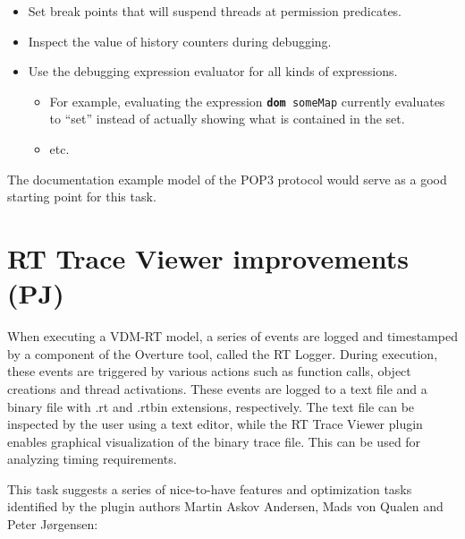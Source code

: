 \documentclass[11pt]{overturerep} \usepackage{t1enc,times,a4,t1enc}
\begin{document}
\begin{itemize} 
    \item Set break points that will suspend threads at permission predicates.
    \item Inspect the value of history counters during debugging. 
    \item Use the debugging expression evaluator for all kinds of expressions.  
        \begin{itemize} 
            \item For example, evaluating the expression \texttt{\textbf{dom}
            someMap} currently evaluates to ``set'' instead of actually showing
            what is contained in the set.  
            \item etc.
        \end{itemize} 
\end{itemize}

The documentation example model of the POP3 protocol would serve as a good
starting point for this task.

\section{RT Trace Viewer improvements (PJ)}

When executing a VDM-RT model, a series of events are logged and timestamped by
a component of the Overture tool, called the RT Logger. During execution, these
events are triggered by various actions such as function calls, object
creations and thread activations. These events are logged to a text file and a
binary file with .rt and .rtbin extensions, respectively. The text file can be
inspected by the user using a text editor, while the RT Trace Viewer plugin
enables graphical visualization of the binary trace file. This can be used for
analyzing timing requirements.

This task suggests a series of nice-to-have features and optimization tasks
identified by the plugin authors Martin Askov Andersen, Mads von Qualen and
Peter J\o rgensen:
\end{document}
